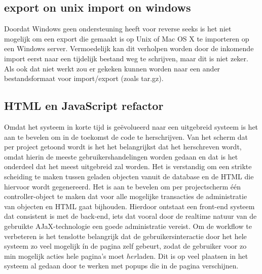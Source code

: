 \subsection{export on unix import on windows}
Doordat Windows geen ondersteuning heeft voor reverse seeks is het niet mogelijk om een export die gemaakt is op Unix of Mac OS X te importeren op een Windows server. Vermoedelijk kan dit verholpen worden door de inkomende import eerst naar een tijdelijk bestand weg te schrijven, maar dit is niet zeker. Als ook dat niet werkt zou er gekeken kunnen worden naar een ander bestandsformaat voor import/export (zoals tar.gz).

\subsection{HTML en JavaScript refactor}
Omdat het systeem in korte tijd is ge\"evolueerd naar een uitgebreid systeem is het aan te bevelen om in de toekomst de code te herschrijven. Van het scherm dat per project getoond wordt is het het belangrijkst dat het herschreven wordt, omdat hierin de meeste gebruikershandelingen worden gedaan en dat is het onderdeel dat het meest uitgebreid zal worden. Het is verstandig om een strikte scheiding te maken tussen geladen objecten vanuit de database en de HTML die hiervoor wordt gegenereerd. Het is aan te bevelen om per projectscherm \'{e}\'{e}n controller-object te maken dat voor alle mogelijke transacties de administratie van objecten en HTML gaat bijhouden. Hierdoor ontstaat een front-end systeem dat consistent is met de back-end, iets dat vooral door de realtime natuur van de gebruikte AJaX-technologie een goede administratie vereist. Om de workflow te verbeteren is het tenslotte belangrijk dat de gebruikersinteractie door het hele systeem zo veel mogelijk \'in de pagina zelf gebeurt, zodat de gebruiker voor zo min mogelijk acties hele pagina's moet \(her\)laden. Dit is op veel plaatsen in het systeem al gedaan door te werken met popups die in de pagina verschijnen.
